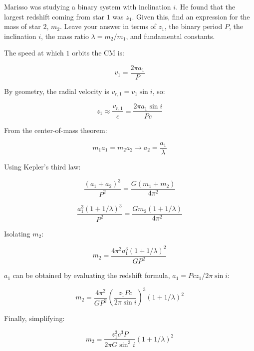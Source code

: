 \documentclass[11pt]{article}
\begin{document}
\begin{pproblem} Marisso was studying a binary system with inclination \(i\). He found that the largest redshift coming from star \(1\) was \(z_1\). Given this, find an expression for the mass of star \(2\), \(m_2\). Leave your answer in terms of \(z_1\), the binary period \(P\), the inclination \(i\), the mass ratio \(\lambda  = m_2/m_1\), and fundamental constants.
    \begin{pssolution*}{}{}
        The speed at which \(1\) orbits the CM is:

        \[v_1 = \frac{2\pi a_1}{P}\]

        By geometry, the radial velocity is \(v_{r,1}=v_1\sin i\), so:

        \[z_1 \approx \frac{v_{r,1}}{c} = \frac{2\pi a_1\sin i}{Pc}\]

        From the center-of-mass theorem:

        \[m_1a_1=m_2a_2 \rightarrow a_2 = \frac{a_1}{\lambda}\]

        Using Kepler's third law:

        \[\frac{(a_1+a_2)^3}{P^2} = \frac{G(m_1+m_2)}{4\pi^2}\]

        \[\frac{a_1^3(1+1/\lambda)^3}{P^2} = \frac{Gm_2(1+1/\lambda)}{4\pi^2}\]

        Isolating \(m_2\):

        \[m_2 = \frac{4\pi^2a_1^3(1+1/\lambda)^2}{GP^2}\]

        \(a_1\) can be obtained by evaluating the redshift formula, \(a_1 = Pcz_1/2\pi\sin i\):

        \[m_2 = \frac{4\pi^2}{GP^2}\left(\frac{z_1Pc}{2\pi\sin i}\right)^3(1+1/\lambda)^2\]

        Finally, simplifying:

        \[\boxed{m_2 = \frac{z_1^3c^3P}{2\pi G \sin^3i}(1+1/\lambda)^2}\]
    \end{pssolution*}
\end{pproblem}
\end{document}
